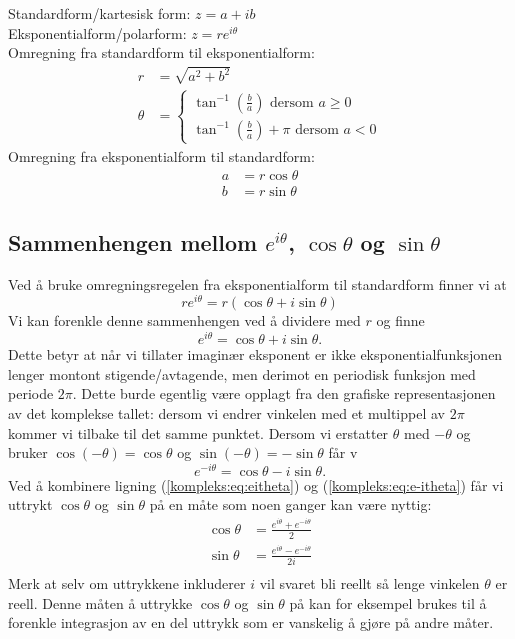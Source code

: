 \documentclass[a4paper,norsk,12pt]{article}
\begin{document}
\begin{tsummary}
Standardform/kartesisk form: $z = a + ib$ \\
Eksponentialform/polarform: $z = re^{i\theta}$ \\[12pt]

Omregning fra standardform til eksponentialform:
\begin{align*}
	r &= \sqrt{a^2+b^2} \\
	\theta &= \begin{cases} 
		\tan^{-1}\left(\frac{b}{a}\right) \text{ dersom } a\geq0 \\
		\tan^{-1}\left(\frac{b}{a}\right)+\pi \text{ dersom } a <0
	\end{cases}
\end{align*}
Omregning fra eksponentialform til standardform:
\begin{align*}
	a &= r\cos\theta \\
	b &= r\sin\theta
\end{align*}
\end{tsummary}

\subsection{Sammenhengen mellom $e^{i\theta}$, $\cos\theta$ og $\sin\theta$}
Ved å bruke omregningsregelen fra eksponentialform til standardform finner vi at
\begin{displaymath}
	re^{i\theta} = r(\cos\theta + i\sin\theta)
\end{displaymath}
Vi kan forenkle denne sammenhengen ved å dividere med $r$ og finne
\begin{equation}
	\label{kompleks:eq:eitheta}
	e^{i\theta} = \cos\theta + i\sin\theta.
\end{equation}
Dette betyr at når vi tillater imaginær eksponent er ikke eksponentialfunksjonen lenger montont stigende/avtagende, men derimot en periodisk funksjon med periode $2\pi$. Dette burde egentlig være opplagt fra den grafiske representasjonen av det komplekse tallet: dersom vi endrer vinkelen med et multippel av $2\pi$ kommer vi tilbake til det samme punktet. Dersom vi erstatter $\theta$ med $-\theta$ og bruker $\cos(-\theta) = \cos\theta$ og $\sin(-\theta) = -\sin\theta$ får v
\begin{equation}
	\label{kompleks:eq:e-itheta}
	e^{-i\theta} = \cos\theta - i\sin\theta.
\end{equation}
Ved å kombinere ligning (\ref{kompleks:eq:eitheta}) og (\ref{kompleks:eq:e-itheta}) får vi uttrykt $\cos\theta$ og $\sin\theta$ på en måte som noen ganger kan være nyttig:
\begin{align*}
	\cos\theta &= \frac{e^{i\theta}+e^{-i\theta}}{2} \\
	\sin\theta &= \frac{e^{i\theta}-e^{-i\theta}}{2i} \\
\end{align*}
Merk at selv om uttrykkene inkluderer $i$ vil svaret bli reellt så lenge vinkelen $\theta$ er reell. Denne måten å uttrykke $\cos\theta$ og $\sin\theta$ på kan for eksempel brukes til å forenkle integrasjon av en del uttrykk som er vanskelig å gjøre på andre måter.
\end{document}
